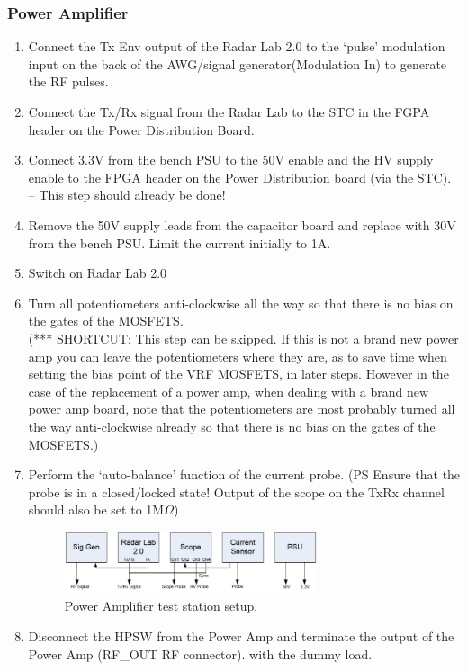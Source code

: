 \subsubsection{Power Amplifier}

\begin{enumerate}
	\item Connect the Tx Env output of the Radar Lab 2.0 to the ‘pulse’ modulation input on the back of the AWG/signal generator(Modulation In) to generate the RF pulses.
	\item Connect the Tx/Rx signal from the Radar Lab to the STC in the FGPA header on the Power Distribution Board.
	\item Connect 3.3V from the bench PSU to the 50V enable and the HV supply enable to the FPGA header on the Power Distribution board (via the STC). – This step should already be done!
	\item Remove the 50V supply leads from the capacitor board and replace with 30V from the bench PSU. Limit the current initially to 1A.
	\item Switch on Radar Lab 2.0
	\item Turn all potentiometers anti-clockwise all the way so that there is no bias on the gates of the MOSFETS.\\
(*** SHORTCUT: This step can be skipped.
If this is not a brand new power amp you can leave the potentiometers where they are, as to save time when setting the bias point of the VRF MOSFETS, in later steps. However in the case of the replacement of a power amp, when dealing with a brand new power amp board, note that the potentiometers are most probably turned all the way anti-clockwise already so that there is no bias on the gates of the MOSFETS.)
	\item Perform the ‘auto-balance’ function of the current probe. (PS Ensure that the probe is in a closed/locked state! Output of the scope on the TxRx channel should also be set to 1M$\Omega$)
		\begin{figure}[H]
			\centering
			\includegraphics[width=0.7\textwidth]{images/hardware/amp_setup.jpg}
			\caption{Power Amplifier test station setup.}
			\label{fig:hw_amp_setup}
		\end{figure}
	\item Disconnect the HPSW from the Power Amp and terminate the output of the Power Amp (RF\_OUT RF connector). with the dummy load.

\end{enumerate}
